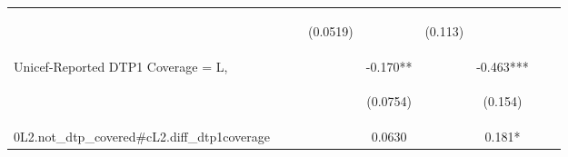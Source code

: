 \documentclass[]{article}
\begin{document}
\begin{center}
\begin{tabular}{lcccccccc}
\vspace{4pt} & \begin{footnotesize}\end{footnotesize} & \begin{footnotesize}\end{footnotesize} & \begin{footnotesize}(0.0519)\end{footnotesize} & \begin{footnotesize}\end{footnotesize} & \begin{footnotesize}(0.113)\end{footnotesize} & \begin{footnotesize}\end{footnotesize} & \begin{footnotesize}\end{footnotesize} & \begin{footnotesize}\end{footnotesize} \\
Unicef-Reported DTP1 Coverage = L, &  &  &  & -0.170** &  & -0.463*** &  &  \\
\vspace{4pt} & \begin{footnotesize}\end{footnotesize} & \begin{footnotesize}\end{footnotesize} & \begin{footnotesize}\end{footnotesize} & \begin{footnotesize}(0.0754)\end{footnotesize} & \begin{footnotesize}\end{footnotesize} & \begin{footnotesize}(0.154)\end{footnotesize} & \begin{footnotesize}\end{footnotesize} & \begin{footnotesize}\end{footnotesize} \\
0L2.not\_dtp\_covered\#cL2.diff\_dtp1coverage &  &  &  & 0.0630 &  & 0.181* &  &  \\

\end{tabular}
\end{center}
\end{document}

